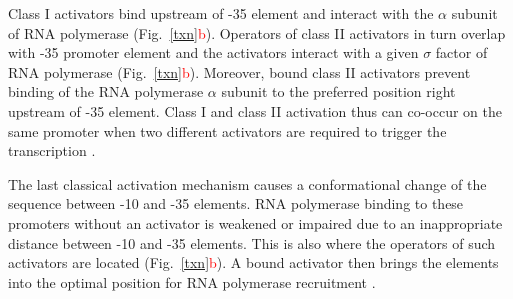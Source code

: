 Class I activators bind upstream of -35 element and interact with the $\alpha$ subunit of RNA polymerase \cite{ushida1990helical} (Fig.~\ref{txn}\textcolor{red}{b}).
Operators of class II activators in turn overlap with -35 promoter element and the activators interact with a given $\sigma$ factor of RNA polymerase \cite{igarashi1991functional} (Fig.~\ref{txn}\textcolor{red}{b}).
Moreover, bound class II activators prevent binding of the RNA polymerase $\alpha$ subunit to the preferred position right upstream of -35 element.
Class I and class II activation thus can co-occur on the same promoter when two different activators are required to trigger the transcription \cite{lloyd2002requirement}.

The last classical activation mechanism causes a conformational change of the sequence between -10 and -35 elements.
RNA polymerase binding to these promoters without an activator is weakened or impaired due to an inappropriate distance between -10 and -35 elements.
This is also where the operators of such activators are located (Fig.~\ref{txn}\textcolor{red}{b}).
A bound activator then brings the elements into the optimal position for RNA polymerase recruitment \cite{heldwein2001crystal}.


